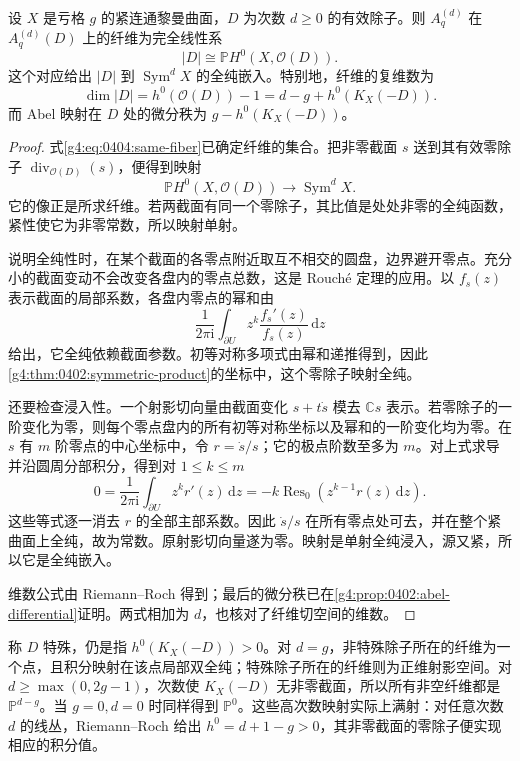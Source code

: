 \begin{theorem}
	\label{g4:thm:0404:abel-fibers}
	设 \(X\) 是亏格 \(g\) 的紧连通黎曼曲面，\(D\) 为次数 \(d\ge0\) 的有效除子。则 \(A_q^{(d)}\) 在 \(A_q^{(d)}(D)\) 上的纤维为完全线性系
	\[
		|D|\cong\mathbb P H^0(X,\mathcal O(D)).
	\]
	这个对应给出 \(|D|\) 到 \(\operatorname{Sym}^dX\) 的全纯嵌入。特别地，纤维的复维数为
	\begin{equation}
		\label{g4:eq:0404:fiber-dimension}
		\dim|D|=h^0(\mathcal O(D))-1
		=d-g+h^0(K_X(-D)).
	\end{equation}
	而 Abel 映射在 \(D\) 处的微分秩为 \(g-h^0(K_X(-D))\)。
\end{theorem}
\begin{proof}
	式\eqref{g4:eq:0404:same-fiber}已确定纤维的集合。把非零截面 \(s\) 送到其有效零除子 \(\operatorname{div}_{\mathcal O(D)}(s)\)，便得到映射
	\[
		\mathbb P H^0(X,\mathcal O(D))\longrightarrow\operatorname{Sym}^dX.
	\]
	它的像正是所求纤维。若两截面有同一个零除子，其比值是处处非零的全纯函数，紧性使它为非零常数，所以映射单射。

	说明全纯性时，在某个截面的各零点附近取互不相交的圆盘，边界避开零点。充分小的截面变动不会改变各盘内的零点总数，这是 Rouché 定理的应用。以 \(f_s(z)\) 表示截面的局部系数，各盘内零点的幂和由
	\[
		\frac1{2\pi\mathrm{i}}\int_{\partial U}
		z^k\frac{f_s'(z)}{f_s(z)}\,\mathrm{d}z
	\]
	给出，它全纯依赖截面参数。初等对称多项式由幂和递推得到，因此\cref{g4:thm:0402:symmetric-product}的坐标中，这个零除子映射全纯。

	还要检查浸入性。一个射影切向量由截面变化 \(s+t\dot s\) 模去 \(\mathbb C s\) 表示。若零除子的一阶变化为零，则每个零点盘内的所有初等对称坐标以及幂和的一阶变化均为零。在 \(s\) 有 \(m\) 阶零点的中心坐标中，令 \(r=\dot s/s\)；它的极点阶数至多为 \(m\)。对上式求导并沿圆周分部积分，得到对 \(1\le k\le m\)
	\[
		0=\frac1{2\pi\mathrm{i}}\int_{\partial U}z^k r'(z)\,\mathrm{d}z
		=-k\operatorname{Res}_0(z^{k-1}r(z)\,\mathrm{d}z).
	\]
	这些等式逐一消去 \(r\) 的全部主部系数。因此 \(\dot s/s\) 在所有零点处可去，并在整个紧曲面上全纯，故为常数。原射影切向量遂为零。映射是单射全纯浸入，源又紧，所以它是全纯嵌入。

	维数公式由 Riemann--Roch 得到；最后的微分秩已在\cref{g4:prop:0402:abel-differential}证明。两式相加为 \(d\)，也核对了纤维切空间的维数。
\end{proof}

称 \(D\) 特殊，仍是指 \(h^0(K_X(-D))>0\)。对 \(d=g\)，非特殊除子所在的纤维为一个点，且积分映射在该点局部双全纯；特殊除子所在的纤维则为正维射影空间。对 \(d\ge\max(0,2g-1)\)，次数使 \(K_X(-D)\) 无非零截面，所以所有非空纤维都是 \(\mathbb P^{d-g}\)。当 \(g=0,d=0\) 时同样得到 \(\mathbb P^0\)。这些高次数映射实际上满射：对任意次数 \(d\) 的线丛，Riemann--Roch 给出 \(h^0=d+1-g>0\)，其非零截面的零除子便实现相应的积分值。

